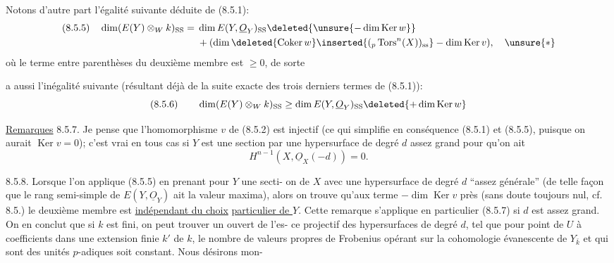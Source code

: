 Notons d'autre part l'égalité suivante déduite de (8.5.1):
\[
\begin{aligned}
(8.5.5)\quad\dim(E(Y)\otimes_W k)_{\mathrm{SS}}={}&\dim E(Y,\underline O_Y)_{\mathrm{SS}}\deleted{\unsure{-\dim\operatorname{Ker}w}}\\
&+(\dim\deleted{\operatorname{Coker}w}\inserted{({}_p\operatorname{Tors}^n(X))_{\mathrm{ss}}}-\dim\operatorname{Ker}v),\quad\unsure{*}
\end{aligned}
\]
où le terme entre parenthèses du deuxième membre est $\geq0$, de sorte 


a aussi l'inégalité suivante (résultant déjà de la suite exacte des
trois derniers termes de (8.5.1)):
\[
(8.5.6)\qquad \dim(E(Y)\otimes_W k)_{\mathrm{SS}}\geq\dim E(Y,\underline O_Y)_{\mathrm{SS}}\deleted{+\dim\operatorname{Ker}w}
\]

\uline{Remarques} 8.5.7. Je pense que l'homomorphisme $v$ de (8.5.2) est
injectif\deleted{\unsure{,}} (ce qui simplifie en conséquence (8.5.1) et (8.5.5), puisque
on aurait $\operatorname{Ker}v=0$); c'est vrai en tous cas si 
$Y$ est 
une section par une hypersurface de degré $d$ assez grand pour qu'on ait
\[H^{n-1}(X,\underline O_X(-d))=0.\]


8.5.8. Lorsque  l'on applique (8.5.5) en prenant pour $Y$ une secti-
on de $X$ avec une hypersurface de degré $d$ ``assez générale'' (de telle
façon que le rang semi-simple de $E(Y,\underline O_Y)$ ait la valeur maxima), alors
on trouve qu'aux terme $-\dim\operatorname{Ker}v$ près (sans doute toujours nul, cf.
8.5.) le deuxième membre est \uline{indépendant du choix}  \uline{particulier de $Y$}.
Cette remarque s'applique en particulier (8.5.7) si $d$ est assez grand.
On en conclut que si $k$ est fini,  on peut trouver un ouvert  de l'es-
ce projectif des hypersurfaces de degré $d$, tel que pour  point  de $U$
à coefficients dans une extension finie $k'$ de $k$, le nombre de valeurs
propres de Frobenius opérant sur la cohomologie évanescente de $Y_{\bar k}$ et
qui sont des unités $p$-adiques soit constant.  Nous désirons mon-

